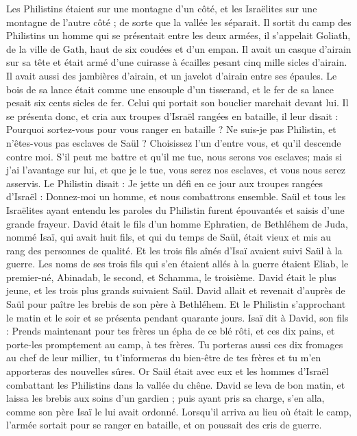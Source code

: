\begin{multicols}{2}
Les Philistins étaient sur une montagne d’un côté, et les Israëlites sur une montagne de l’autre côté ; de sorte que la vallée les séparait.
Il sortit du camp des Philistins un homme qui se présentait entre les deux armées, il s’appelait Goliath, de la ville de Gath, haut de six coudées et d'un empan.
Il avait un casque d'airain sur sa tête et était armé d'une cuirasse à écailles pesant cinq mille sicles d'airain.
Il avait aussi des jambières d'airain, et un javelot d'airain entre ses épaules.
Le bois de sa lance était comme une ensouple d'un tisserand, et le fer de sa lance pesait six cents sicles de fer. Celui qui portait son bouclier marchait devant lui.
Il se présenta donc, et cria aux troupes d'Israël rangées en bataille, il leur disait : Pourquoi sortez-vous pour vous ranger en bataille ? Ne suis-je pas Philistin, et n'êtes-vous pas esclaves de Saül ? Choisissez l'un d'entre vous, et qu'il descende contre moi.
S’il peut me battre et qu'il me tue, nous serons vos esclaves; mais si j'ai l'avantage sur lui, et que je le tue, vous serez nos esclaves, et vous nous serez asservis.
Le Philistin disait : Je jette un défi en ce jour aux troupes rangées d'Israël : Donnez-moi un homme, et nous combattrons ensemble.
Saül et tous les Israëlites ayant entendu les paroles du Philistin furent épouvantés et saisis d’une grande frayeur.
David était le fils d'un homme Ephratien, de Bethléhem de Juda, nommé Isaï, qui avait huit fils, et qui du temps de Saül, était vieux et mis au rang des personnes de qualité.
Et les trois fils aînés d'Isaï avaient suivi Saül à la guerre. Les noms de ses trois fils qui s'en étaient allés à la guerre étaient Eliab, le premier-né, Abinadab, le second, et Schamma, le troisième.
David était le plus jeune, et les trois plus grands suivaient Saül.
David allait et revenait d'auprès de Saül pour paître les brebis de son père à Bethléhem.
Et le Philistin s'approchant le matin et le soir et se présenta pendant quarante jours.
Isaï dit à David, son fils : Prends maintenant pour tes frères un épha de ce blé rôti, et ces dix pains, et porte-les promptement au camp, à tes frères.
Tu porteras aussi ces dix fromages au chef de leur millier, tu t’informeras du bien-être de tes frères et tu m'en apporteras des nouvelles sûres.
Or Saül était avec eux et les hommes d'Israël combattant les Philistins dans la vallée du chêne.
David se leva de bon matin, et laissa les brebis aux soins d’un gardien ; puis ayant pris sa charge, s'en alla, comme son père Isaï le lui avait ordonné. Lorsqu’il arriva au lieu où était le camp, l'armée sortait pour se ranger en bataille, et on poussait des cris de guerre.

\end{multicols}
